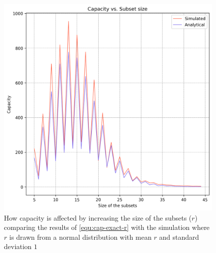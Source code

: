     \begin{figure}%
        \centering
        \includegraphics[scale=0.83]{figures/cap-vs-r-bounded-exact-1.png}
        \caption[Capacity vs. Size of the subsets ($r$) when $r \sim \mathcal{N}(r,1)$ comparing exact formula vs simulation]{How capacity is affected by increasing the size of the subsets ($r$) comparing the results of \ref{equ:cap-exact-r} with the simulation where $r$ is drawn from a normal distribution with mean $r$ and standard deviation $1$}
        \label{figure:cap-vs-r-bounded-exact-1}
        \end{figure}

